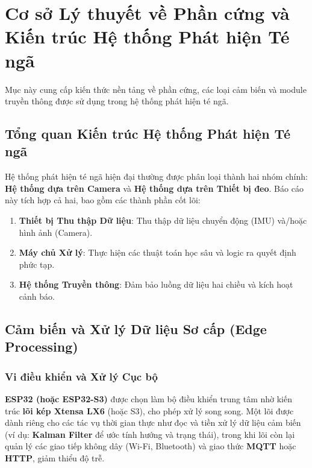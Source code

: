 \section{Cơ sở Lý thuyết về Phần cứng và Kiến trúc Hệ thống Phát hiện Té ngã}
\label{sec:hardware_theory}

Mục này cung cấp kiến thức nền tảng về phần cứng, các loại cảm biến và module truyền thông được sử dụng trong hệ thống phát hiện té ngã.

\subsection{Tổng quan Kiến trúc Hệ thống Phát hiện Té ngã}
Hệ thống phát hiện té ngã hiện đại thường được phân loại thành hai nhóm chính: \textbf{Hệ thống dựa trên Camera} và \textbf{Hệ thống dựa trên Thiết bị đeo}. Báo cáo này tích hợp cả hai, bao gồm các thành phần cốt lõi:
\begin{enumerate}
    \item \textbf{Thiết bị Thu thập Dữ liệu}: Thu thập dữ liệu chuyển động (IMU) và/hoặc hình ảnh (Camera).
    \item \textbf{Máy chủ Xử lý}: Thực hiện các thuật toán học sâu và logic ra quyết định phức tạp.
    \item \textbf{Hệ thống Truyền thông}: Đảm bảo luồng dữ liệu hai chiều và kích hoạt cảnh báo.
\end{enumerate}

\subsection{Cảm biến và Xử lý Dữ liệu Sơ cấp (Edge Processing)}

\subsubsection{Vi điều khiển và Xử lý Cục bộ}
\textbf{ESP32 (hoặc ESP32-S3)} được chọn làm bộ điều khiển trung tâm nhờ kiến trúc \textbf{lõi kép Xtensa LX6} (hoặc S3), cho phép xử lý song song. Một lõi được dành riêng cho các tác vụ thời gian thực như đọc và tiền xử lý dữ liệu cảm biến (ví dụ: \textbf{Kalman Filter} để ước tính hướng và trạng thái), trong khi lõi còn lại quản lý các giao tiếp không dây (Wi-Fi, Bluetooth) và giao thức \textbf{MQTT} hoặc \textbf{HTTP}, giảm thiểu độ trễ.

